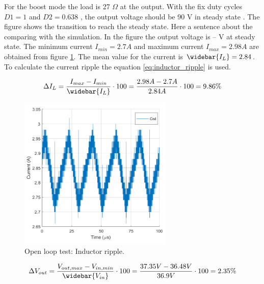 For the boost mode the load is 27 $\Omega$ at the output. With the fix duty cycles $D1 = 1$ and  $D2 = 0.638$ , the output voltage should be 90 V in steady state . The figure shows the transition to reach the steady state. Here a sentence about the comparing with the simulation. In the figure the output voltage is -- V  at steady state. The minimum current $I_{min} = 2.7A$ and maximum current $I_{max} = 2.98A$ are obtained from figure \ref{Openlooptestinductor}. The mean value for the current is $\widebar{I_L}= 2.84$. To calculate the current ripple the equation \ref{eq:inductor_ripple} is used.

\begin{equation} \label{eq:inductor_rippleexpirment}
\Delta I_L = \frac{I_{max}-I_{min}}{\widebar{I_L}} \cdot 100 = \frac{2.98A-2.7A}{2.84A} \cdot 100 = 9.86\%
\end{equation}

\begin{figure}[H]
	\begin{center}
		\includegraphics[width=0.65\textwidth]{../Pictures/P1/Test/Openloopinductor}
		\caption{Open loop test: Inductor ripple.}
		\label{Openlooptestinductor}
	\end{center}	
\end{figure}

\begin{equation} \label{eq:input_voltage_rippleexperiment}
\Delta V_{out} = \frac{V_{out,max}-V_{in,min}}{\widebar{V_{in}}} \cdot 100 = \frac{37.35V - 36.48V }{36.9V} \cdot 100 = 2.35\%
\end{equation}


